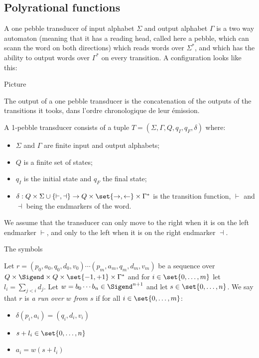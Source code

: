 \subsection{Polyrational functions}

A one pebble transducer of input alphabet $\Sigma$ and output alphabet $\Gamma$ is a two way automaton (meaning that it has a reading head, called here a pebble, which can scann the word on both directions) which reads words over $\Sigma^*$, and which has the ability to output words over $\Gamma^*$ on every transition. A configuration looks like this:
\begin{center}
Picture
\end{center} 
The output of a one pebble transducer is the concatenation of the outputs of the transitions it tooks,  dans l'ordre chronologique de leur émission.

\begin{definition}
A 1-pebble transducer consists of a tuple $T=(\Sigma,\Gamma,Q, q_I,q_F,\delta)$ where:
\begin{itemize}
\item  $\Sigma$ and $\Gamma$ are finite input and output alphabets; 
\item $Q$ is a finite set of states;
\item $q_I$ is the initial state and $q_F$ the final state;
\item $\delta : Q\times \Sigma\cup\{\vdash,\dashv\} \to Q\times\set{\rightarrow,\leftarrow}\times\Gamma^*$ is the transition function,  $\vdash$ and $\dashv$ being the endmarkers of the word. 
\end{itemize}
We assume that the transducer can only move to the right when it is on the left endmarker $\vdash$, and only to the left when  it is on the right endmarker $\dashv$.
\end{definition}
The symbols  


Let $r=(p_0,a_0,q_0,d_0,v_0)\cdots (p_m,a_m,q_m,d_m,v_m)$ be a sequence over $Q\times \Sigend\times Q\times \set{-1,+1}\times \Gamma^*$ and for $i\in \set{0,\ldots,m}$ let  $l_i=\sum_{j< i }d_j$.
Let $w=b_0\cdots b_n\in \Sigend^{n+1}$ and let $s\in \set{0,\ldots, n}$. We say that $r$ is \emph{a run over $w$ from $s$} if for all $i\in \set{0,\ldots,m}$:

\begin{itemize}
\item $\delta(p_i,a_i)=(q_i,d_i,v_i)$
\item $s+l_i\in \set{0,\ldots, n}$
\item $a_i=w(s+l_i)$
\end{itemize}


